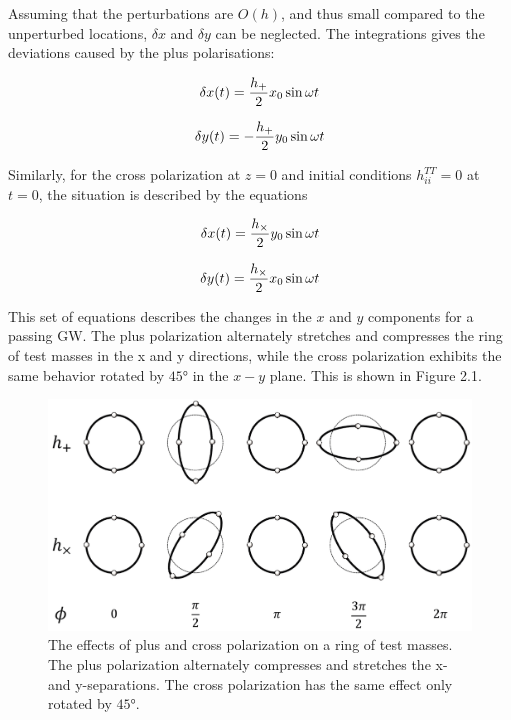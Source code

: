 \documentclass[binding=0.6cm, LaM]{sapthesis}
\begin{document}
	Assuming that the perturbations are $O(h)$, and thus small compared to the unperturbed locations, $\delta x$ and $\delta y$ can be neglected.
	The integrations gives the deviations caused by the plus polarisations:

		\begin{equation}
		\delta x(t) =  {{h_{+}} \over 2} x_0 \sin \omega t
		\end{equation}

		\begin{equation}
		\delta y(t) = - {{h_{+}} \over 2} y_0  \sin \omega t
		\end{equation}

	Similarly, for the cross polarization at $z=0$ and initial conditions $h_{ii}^{TT} = 0$ at $t= 0$, the situation is described by the equations
		
		\begin{equation}
		\delta x(t) =  {{h_{\times}} \over 2} y_0 \sin \omega t
		\end{equation}

		\begin{equation}
		\delta y(t) =  {{h_{\times}} \over 2} x_0  \sin \omega t
		\end{equation}
		
	This set of equations describes the changes in the $x$ and $y$ components for a passing GW.
	The plus polarization alternately stretches and compresses the ring of test masses in the x and y directions, 
	while the cross polarization exhibits the same behavior rotated by $\ang{45}$ in the $x - y$ plane. This is shown in Figure 2.1.
		\begin{figure}
		\includegraphics[scale=1]{ring}
		\centering
		\caption{The effects of plus and cross polarization on a ring of test masses. 
			 The plus polarization alternately compresses and stretches the x- and y-separations.
			 The cross polarization has the same effect only rotated by  $\ang{45}$.}
		\label{fig:ring}
		\end{figure}
\end{document}
